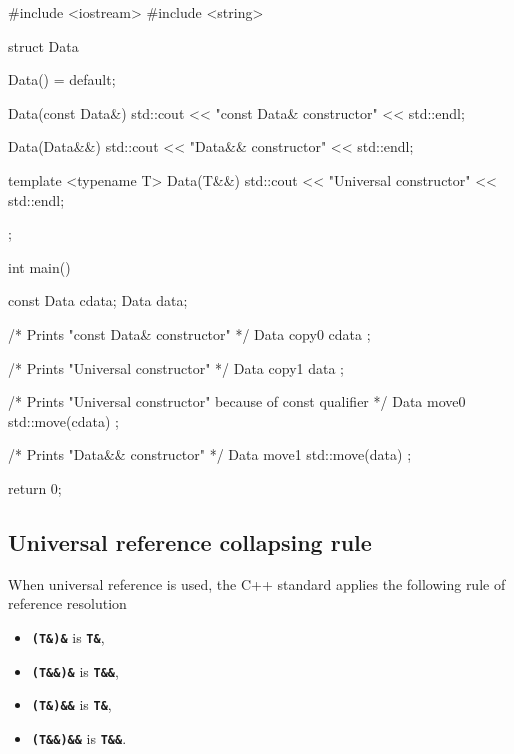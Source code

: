 \documentclass[../main]{subfiles}
\begin{document}
\begin{Code}
    #include <iostream>
    #include <string>
    
    struct Data
    {
        Data() = default;
    
        Data(const Data&)
        {
            std::cout << "const Data& constructor" << std::endl;
        }
    
        Data(Data&&)
        {
            std::cout << "Data&& constructor" << std::endl;
        }
    
        template <typename T>
        Data(T&&)
        {
            std::cout << "Universal constructor" << std::endl;
        }
    };
    
    int main()
    {
        const Data cdata;
        Data data;
    
        /* Prints "const Data& constructor" */
        Data copy0 { cdata };
        
        /* Prints "Universal constructor" */
        Data copy1 { data };
    
        /* Prints "Universal constructor" because of const qualifier */
        Data move0 { std::move(cdata) };
        
        /* Prints "Data&& constructor" */
        Data move1 { std::move(data) };
    
        return 0;
    }
\end{Code}

\subsection{Universal reference collapsing rule}
    When universal reference is used, the C++ standard applies the following rule of reference resolution
\begin{itemize}
    \item \textbf{\texttt{(T\&)\&}} is \textbf{\texttt{T\&}},
    \item \textbf{\texttt{(T\&\&)\&}} is \textbf{\texttt{T\&\&}},
    \item \textbf{\texttt{(T\&)\&\&}} is \textbf{\texttt{T\&}},
    \item \textbf{\texttt{(T\&\&)\&\&}} is \textbf{\texttt{T\&\&}}.
\end{itemize}
\end{document}
